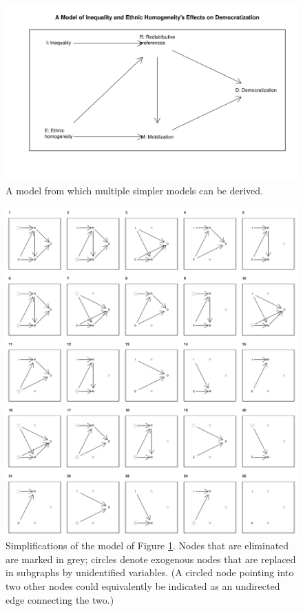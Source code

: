 \documentclass[
  12pt,
]{book}
\begin{document}
\begin{figure}

{\centering \includegraphics[width=.5\textwidth]{ii_files/figure-latex/lowercomplexdem-1} 

}

\caption{A model  from which multiple simpler models can be derived.}\label{fig:lowercomplexdem}
\end{figure}



\begin{figure}

{\centering \includegraphics{ii_files/figure-latex/runningsubs-1} 

}

\caption{Simplifications of the model of Figure \ref{fig:lowercomplexdem}. Nodes that are eliminated are marked in grey; circles denote exogenous nodes that are replaced in subgraphs by unidentified variables. (A circled node pointing into two other nodes could equivalently be indicated as an undirected edge connecting the two.)}\label{fig:runningsubs}
\end{figure}
\end{document}
